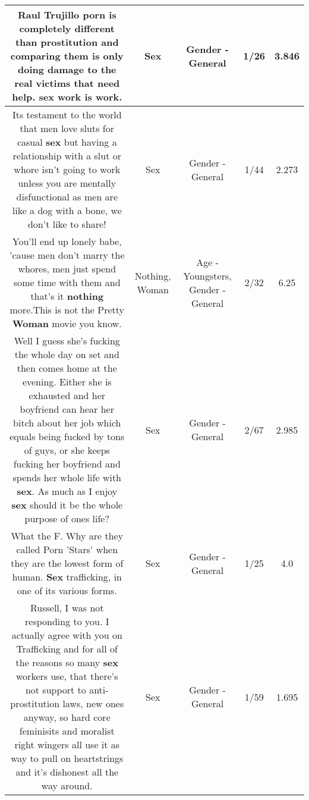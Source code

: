 \documentclass[11pt]{article}
\newlength\mylength
\begin{document}
\begin{center}
\begin{longtable}{|C{.65\mylength}|C{.30\mylength}|C{.12\mylength}|C{.12\mylength}|C{.12\mylength}|}
  \small Raul Trujillo porn is completely different than prostitution and comparing them is only doing damage to the real victims that need help. \textbf{sex} work is work.\normalsize   & Sex & Gender - General & 1/26 & 3.846 \\  \hline
  \small Its testament to the world that men love sluts for casual \textbf{sex} but having a relationship with a slut or whore isn't going to work unless you are mentally disfunctional as men are like a dog with a bone, we don't like to share!\normalsize   & Sex & Gender - General & 1/44 & 2.273 \\  \hline
  \small You'll end up lonely babe, 'cause men don't marry the whores, men just spend some time with them and that's it \textbf{nothing} more.This is not the Pretty \textbf{Woman} movie you know.\normalsize   & Nothing, Woman & Age - Youngsters, Gender - General & 2/32 & 6.25 \\  \hline
  \small Well I guess she's fucking the whole day on set and then comes home at the evening. Either she is exhausted and her boyfriend can hear her bitch about her job which equals being fucked by tons of guys, or she keeps fucking her boyfriend and spends her whole life with \textbf{sex}. As much as I enjoy \textbf{sex} should  it be the whole purpose of ones life?\normalsize   & Sex & Gender - General & 2/67 & 2.985 \\  \hline
  \small What the F.  Why are they called Porn 'Stars' when they are the lowest form of human.  \textbf{Sex} trafficking, in one of its various forms.\normalsize   & Sex & Gender - General & 1/25 & 4.0 \\  \hline
  \small Russell, I was not responding to you. I actually  agree with you on Trafficking and for all of the reasons so many \textbf{sex} workers use, that there's not support to anti-prostitution laws, new ones anyway, so hard core feminisits and moralist right wingers all use it as  way to pull on heartstrings and it's dishonest all the way around.\normalsize   & Sex & Gender - General & 1/59 & 1.695 \\  \hline

\end{longtable}
\end{center}
\end{document}
